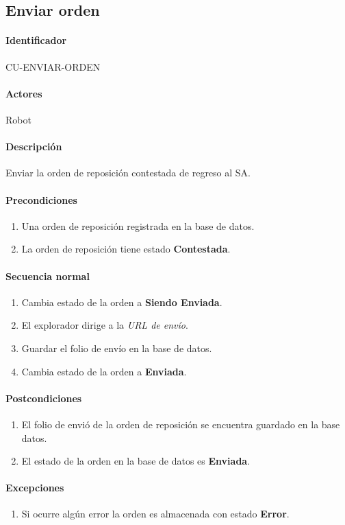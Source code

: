 \subsection{Enviar orden}\label{cu-enviar-orden}
\paragraph{Identificador}
CU-ENVIAR-ORDEN
\paragraph{Actores}
Robot
\paragraph{Descripción}
Enviar la orden de reposición contestada de regreso al SA.
\paragraph{Precondiciones}
\begin{enumerate}
  \item Una orden de reposición registrada en la base de datos.
  \item La orden de reposición tiene estado \textbf{Contestada}.
\end{enumerate}
\paragraph{Secuencia normal}
\begin{enumerate}
  \item Cambia estado de la orden a \textbf{Siendo Enviada}.
  \item El explorador dirige a la \textit{URL de envío}.
  \item Guardar el folio de envío en la base de datos.
  \item Cambia estado de la orden a \textbf{Enviada}.
\end{enumerate}
\paragraph{Postcondiciones}
\begin{enumerate}
  \item El folio de envió de la orden de reposición se encuentra guardado en la base datos.
  \item El estado de la orden en la base de datos es \textbf{Enviada}.
\end{enumerate}
\paragraph{Excepciones}
\begin{enumerate}
  \item Si ocurre algún error la orden es almacenada con estado \textbf{Error}.
\end{enumerate}


